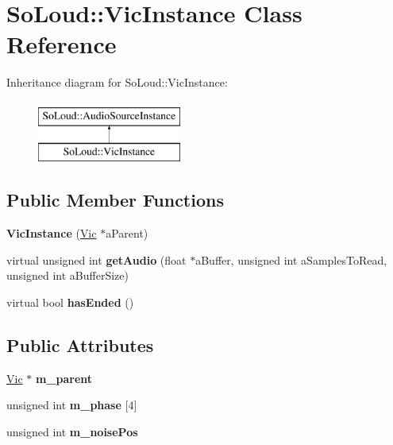 \hypertarget{class_so_loud_1_1_vic_instance}{}\section{So\+Loud\+::Vic\+Instance Class Reference}
\label{class_so_loud_1_1_vic_instance}
Inheritance diagram for So\+Loud\+::Vic\+Instance\+:\begin{figure}[H]
\begin{center}
\leavevmode
\includegraphics[height=2.000000cm]{class_so_loud_1_1_vic_instance}
\end{center}
\end{figure}
\subsection*{Public Member Functions}
\begin{DoxyCompactItemize}
\item 
\mbox{\label{class_so_loud_1_1_vic_instance_ab6ed565589e8f62e1c05cccceb78cbb6}} 
{\bfseries Vic\+Instance} (\mbox{\hyperlink{class_so_loud_1_1_vic}{Vic}} $\ast$a\+Parent)
\item 
\mbox{\label{class_so_loud_1_1_vic_instance_a06b268f798653ac67670cfcec6dd4bd2}} 
virtual unsigned int {\bfseries get\+Audio} (float $\ast$a\+Buffer, unsigned int a\+Samples\+To\+Read, unsigned int a\+Buffer\+Size)
\item 
\mbox{\label{class_so_loud_1_1_vic_instance_a59aba62fb0db461fbaa25f0027792381}} 
virtual bool {\bfseries has\+Ended} ()
\end{DoxyCompactItemize}
\subsection*{Public Attributes}
\begin{DoxyCompactItemize}
\item 
\mbox{\label{class_so_loud_1_1_vic_instance_a3061c748fb68a716d9607f2e8a09a06f}} 
\mbox{\hyperlink{class_so_loud_1_1_vic}{Vic}} $\ast$ {\bfseries m\+\_\+parent}
\item 
\mbox{\label{class_so_loud_1_1_vic_instance_a00e7c5001b8456460c6e598326354379}} 
unsigned int {\bfseries m\+\_\+phase} \mbox{[}4\mbox{]}
\item 
\mbox{\label{class_so_loud_1_1_vic_instance_a4e9226c213f59c59e2c8388555cb6c07}} 
unsigned int {\bfseries m\+\_\+noise\+Pos}
\end{DoxyCompactItemize}
